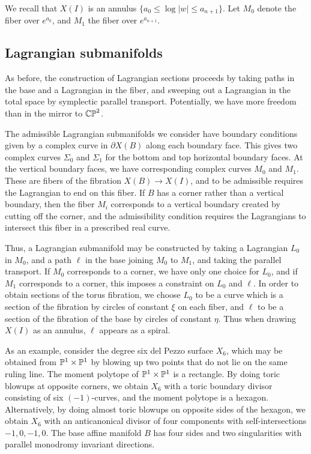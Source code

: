 \documentclass[12pt]{amsart}
\begin{document}
We recall that $X(I)$ is an annulus $\{a_0 \leq \log|w| \leq a_{n+1}\}$. Let $M_0$ denote the fiber over $e^{a_0}$, and $M_1$ the fiber over $e^{a_{n+1}}$. 


\subsection{Lagrangian submanifolds}
\label{sec:other-lagrangian}

As before, the construction of Lagrangian sections proceeds by taking
paths in the base and a Lagrangian in the fiber, and sweeping out a
Lagrangian in the total space by symplectic parallel transport. Potentially, we
have more freedom than in the mirror to $\mathbb{CP}^2$.

The admissible Lagrangian submanifolds we consider have boundary
conditions given by a complex curve in $\partial X(B)$ along each
boundary face. This gives two complex curves $\Sigma_0$ and $\Sigma_1$
for the bottom and top horizontal boundary faces. At the vertical
boundary faces, we have corresponding complex curves $M_0$ and $M_1$. These are fibers of the fibration $X(B)\to X(I)$, and to be
admissible requires the Lagrangian to end on this fiber. If $B$ has a
corner rather than a vertical boundary, then the fiber $M_i$ corresponds
to a vertical boundary created by cutting off the corner, and the
admissibility condition requires the Lagrangians to intersect this
fiber in a prescribed real curve.

Thus, a Lagrangian submanifold may be constructed by taking a
Lagrangian $L_0$ in $M_0$, and a path $\ell$ in the base joining $M_0$
to $M_1$, and taking the parallel transport. If $M_0$ corresponds to a
corner, we have only one choice for $L_0$, and if $M_1$ corresponds to
a corner, this imposes a constraint on $L_0$ and $\ell$. In order to
obtain sections of the torus fibration, we choose $L_0$ to be a curve
which is a section of the fibration by circles of
constant $\xi$ on each fiber, and $\ell$ to be a section of the fibration of the base
by circles of constant $\eta$. Thus when drawing $X(I)$ as an annulus,
$\ell$ appears as a spiral. 

As an example, consider the degree six del Pezzo surface $X_6$, which may be obtained from $\mathbb{P}^1\times \mathbb{P}^1$ by blowing up two points that do not lie on the same ruling line. The moment polytope of $\mathbb{P}^1\times \mathbb{P}^1$ is a rectangle. By doing toric blowups at opposite corners, we obtain $X_6$ with a toric boundary divisor consisting of six $(-1)$-curves, and the moment polytope is a hexagon. Alternatively, by doing almost toric blowups \cite{symington} on opposite sides of the hexagon, we obtain $X_6$ with an anticanonical divisor of four components with self-intersections $-1,0,-1,0$. The base affine manifold $B$ has four sides and two singularities with parallel monodromy invariant directions.
\end{document}
